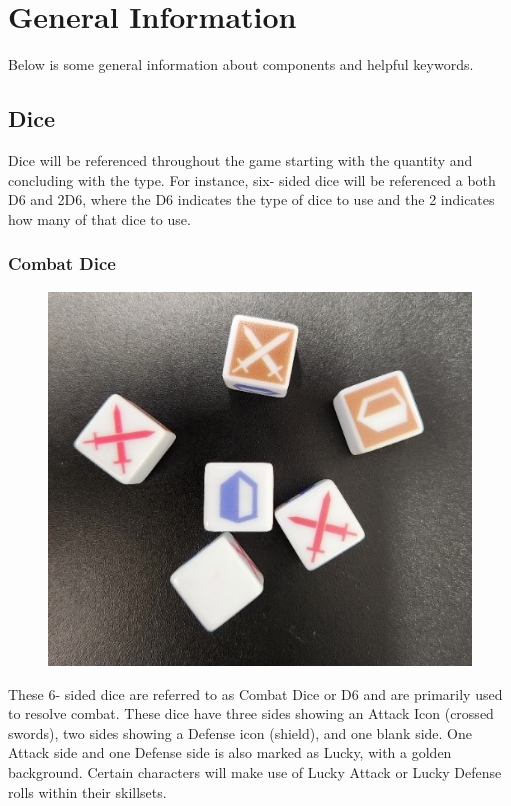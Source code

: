 \documentclass[../main.tex]{subfiles}
\begin{document}
\section{General Information}
Below is some general information about components and helpful keywords. 

\subsection{Dice}
Dice will be referenced throughout the game starting with the quantity and concluding with the type. For instance, six- sided dice will be referenced a both D6 and 2D6, where the D6 indicates the type of dice to use and the 2 indicates how many of that dice to use. 

\subsubsection{Combat Dice}
\begin{figure}[h]
    \centering
    \includegraphics[width=0.75\linewidth]{chapters//generalInformation/TimeStrikeCombatDice.jpg}
\end{figure}

These 6- sided dice are referred to as Combat Dice or D6 and are primarily used to resolve combat. These dice have three sides showing an Attack Icon (crossed swords), two sides showing a Defense icon (shield), and one blank side. One Attack side and one Defense side is also marked as Lucky, with a golden background. Certain characters will make use of Lucky Attack or Lucky Defense rolls within their skillsets. 
\end{document}
